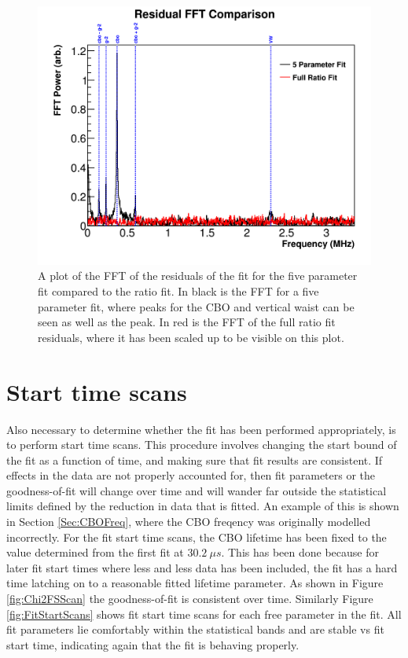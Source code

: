 	\begin{figure}[]
		\centering
		\includegraphics[width=\textwidth]{FFTComparison_RatioCBO}
	    \caption[FFTComparison_RatioCBO]{A plot of the FFT of the residuals of the fit for the five parameter fit compared to the ratio fit. In black is the FFT for a five parameter fit, where peaks for the CBO and vertical waist can be seen as well as the \gmtwo peak. In red is the FFT of the full ratio fit residuals, where it has been scaled up to be visible on this plot.}
	    \label{fig:FFTComparison_RatioCBO}
	\end{figure}

\clearpage

\section{Start time scans}

	Also necessary to determine whether the fit has been performed appropriately, is to perform start time scans. This procedure involves changing the start bound of the fit as a function of time, and making sure that fit results are consistent. If effects in the data are not properly accounted for, then fit parameters or the goodness-of-fit will change over time and will wander far outside the statistical limits defined by the reduction in data that is fitted. An example of this is shown in Section \ref{Sec:CBOFreq}, where the CBO freqency was originally modelled incorrectly. For the fit start time scans, the CBO lifetime has been fixed to the value determined from the first fit at $\SI{30.2}{\mu s}$. This has been done because for later fit start times where less and less data has been included, the fit has a hard time latching on to a reasonable fitted lifetime parameter. As shown in Figure \ref{fig:Chi2FSScan} the goodness-of-fit is consistent over time. Similarly Figure \ref{fig:FitStartScans} shows fit start time scans for each free parameter in the fit. All fit parameters lie comfortably within the statistical bands and are stable vs fit start time, indicating again that the fit is behaving properly.


